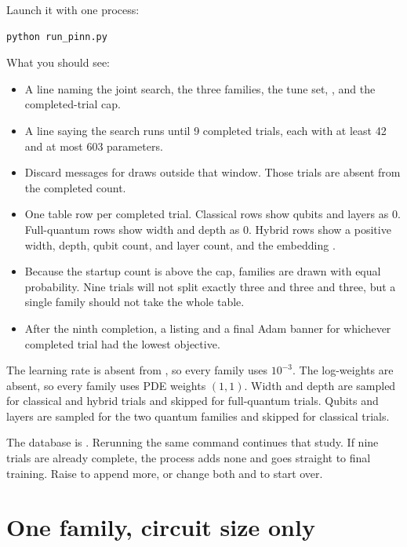 Launch it with one process:

\begin{lstlisting}[style=sh]
python run_pinn.py
\end{lstlisting}

What you should see:

\begin{itemize}
\item A line naming the joint search, the three families, the tune set, , and the completed-trial cap.
\item A line saying the search runs until 9 completed trials, each with at least 42 and at most 603 parameters.
\item Discard messages for draws outside that window.
  Those trials are absent from the completed count.
\item One table row per completed trial.
  Classical rows show qubits and layers as 0.
  Full-quantum rows show width and depth as 0.
  Hybrid rows show a positive width, depth, qubit count, and layer count, and the embedding .
\item Because the startup count is above the cap, families are drawn with equal probability.
  Nine trials will not split exactly three and three and three, but a single family should not take the whole table.
\item After the ninth completion, a  listing and a final Adam banner for whichever completed trial had the lowest objective.
\end{itemize}

The learning rate is absent from , so every family uses \(10^{-3}\).
The log-weights are absent, so every family uses PDE weights \((1,1)\).
Width and depth are sampled for classical and hybrid trials and skipped for full-quantum trials.
Qubits and layers are sampled for the two quantum families and skipped for classical trials.

The database is
.
Rerunning the same command continues that study.
If nine trials are already complete, the process adds none and goes straight to final training.
Raise  to append more, or change both  and  to start over.

\section{One family, circuit size only}

